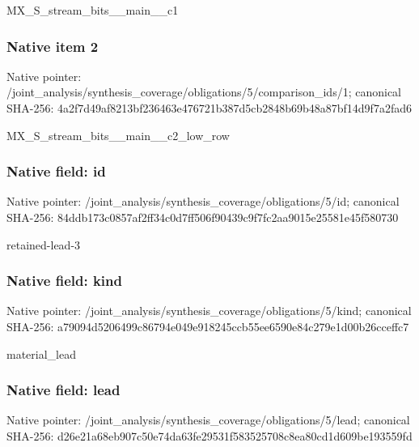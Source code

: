 \documentclass[10pt,a4paper]{article}
\begin{document}
\begingroup\raggedright\sloppy MX\_\allowbreak{}S\_\allowbreak{}stream\_\allowbreak{}bits\_\allowbreak{}\_\allowbreak{}main\_\allowbreak{}\_\allowbreak{}c1\par\endgroup

\subsubsection{Native item 2}
Native pointer: /joint\_\allowbreak{}analysis/synthesis\_\allowbreak{}coverage/obligations/5/comparison\_\allowbreak{}ids/1; canonical SHA-256: 4a2f7d49af8213bf236463e476721b387d5cb2848b69b48a87bf14d9f7a2fad6

\begingroup\raggedright\sloppy MX\_\allowbreak{}S\_\allowbreak{}stream\_\allowbreak{}bits\_\allowbreak{}\_\allowbreak{}main\_\allowbreak{}\_\allowbreak{}c2\_\allowbreak{}low\_\allowbreak{}row\par\endgroup

\subsubsection{Native field: id}
Native pointer: /joint\_\allowbreak{}analysis/synthesis\_\allowbreak{}coverage/obligations/5/id; canonical SHA-256: 84ddb173c0857af2ff34c0d7ff506f90439c9f7fc2aa9015e25581e45f580730

\begingroup\raggedright\sloppy retained-lead-3\par\endgroup

\subsubsection{Native field: kind}
Native pointer: /joint\_\allowbreak{}analysis/synthesis\_\allowbreak{}coverage/obligations/5/kind; canonical SHA-256: a79094d5206499c86794e049e918245ccb55ee6590e84c279e1d00b26cceffc7

\begingroup\raggedright\sloppy material\_\allowbreak{}lead\par\endgroup

\subsubsection{Native field: lead}
Native pointer: /joint\_\allowbreak{}analysis/synthesis\_\allowbreak{}coverage/obligations/5/lead; canonical SHA-256: d26e21a68eb907c50e74da63fe29531f583525708c8ea80cd1d609be193559fd
\end{document}
